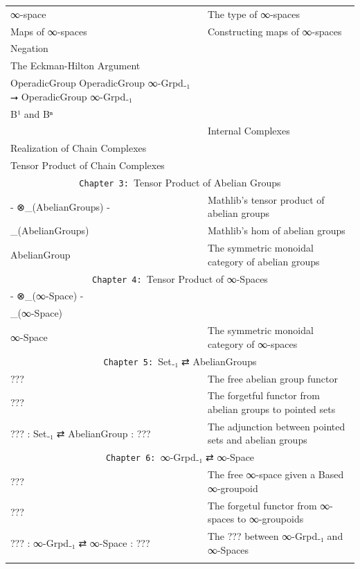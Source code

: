 \documentclass{book}
\theoremstyle{definition}
\begin{document}
{\begin{longtable}{|| l || l ||}
{\hline \hline
 \multicolumn{2}{||c||}{\texttt{Chapter 2: }∞-Spaces} \\
\hline \hline
∞-space & The type of ∞-spaces \\
\hline
Maps of ∞-spaces & Constructing maps of ∞-spaces \\
\hline
Negation & \\
\hline
The Eckman-Hilton Argument & \\
\hline
OperadicGroup OperadicGroup ∞-Grpd₋₁ ⭢ OperadicGroup ∞-Grpd₋₁ & \\
\hline
B¹ and Bⁿ & \\
\hline
[E⃗.obj ℕ, -] & Internal Complexes \\
\hline
Realization of Chain Complexes & \\
\hline
Tensor Product of Chain Complexes & \\
\hline \hline
\multicolumn{2}{||c||}{\texttt{Chapter 3: }Tensor Product of Abelian Groups} \\
\hline \hline
- ⊗\_(AbelianGroups) - & Mathlib's tensor product of abelian groups \\
\hline
[-,-]\_(AbelianGroups) & Mathlib's hom of abelian groups\\
\hline
AbelianGroup & The symmetric monoidal category of abelian groups\\
\hline \hline
\multicolumn{2}{||c||}{\texttt{Chapter 4: }Tensor Product of ∞-Spaces} \\
\hline \hline
- ⊗\_(∞-Space) - &  \\
\hline
[-,-]\_(∞-Space) &  \\
\hline
∞-Space & The symmetric monoidal category of ∞-spaces \\
\hline \hline
 \multicolumn{2}{||c||}{\texttt{Chapter 5: }Set₋₁ ⇄ AbelianGroups} \\
\hline \hline
??? & The free abelian group functor \\
 \hline
??? & The forgetful functor from abelian groups to pointed sets \\
 \hline
??? : Set₋₁ ⇄ AbelianGroup : ??? & The adjunction between pointed sets and abelian groups \\
\hline \hline
 \multicolumn{2}{||c||}{\texttt{Chapter 6: }∞-Grpd₋₁ ⇄ ∞-Space} \\
\hline \hline
??? & The free ∞-space given a Based ∞-groupoid \\
\hline
??? & The forgetul functor from ∞-spaces to ∞-groupoids \\
\hline
??? : ∞-Grpd₋₁ ⇄ ∞-Space : ??? & The ??? between ∞-Grpd₋₁ and ∞-Spaces \\
}
\end{longtable}}
\end{document}
